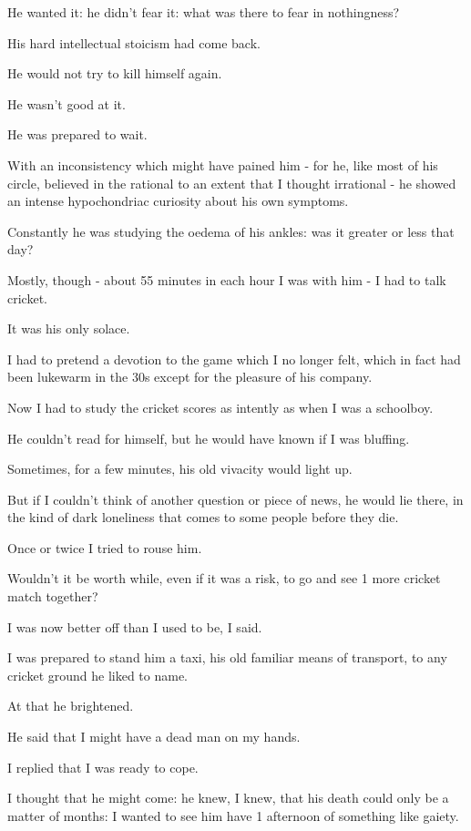 \documentclass{article}
\numberwithin{equation}{section}
\begin{document}
He wanted it: he didn't fear it: what was there to fear in nothingness?

His hard intellectual stoicism had come back.

He would not try to kill himself again.

He wasn't good at it.

He was prepared to wait.

With an inconsistency which might have pained him - for he, like most of his circle, believed in the rational to an extent that I thought irrational - he showed an intense hypochondriac curiosity about his own symptoms.

Constantly he was studying the oedema of his ankles: was it greater or less that day?

%
Mostly, though - about 55 minutes in each hour I was with him - I had to talk cricket.

It was his only solace.

I had to pretend a devotion to the game which I no longer felt, which in fact had been lukewarm in the 30s except for the pleasure of his company.

Now I had to study the cricket scores as intently as when I was a schoolboy.

He couldn't read for himself, but he would have known if I was bluffing.

Sometimes, for a few minutes, his old vivacity would light up.

But if I couldn't think of another question or piece of news, he would lie there, in the kind of dark loneliness that comes to some people before they die.

%
Once or twice I tried to rouse him.

Wouldn't it be worth while, even if it was a risk, to go and see 1 more cricket match together?

I was now better off than I used to be, I said.

I was prepared to stand him a taxi, his old familiar means of transport, to any cricket ground he liked to name.

At that he brightened.

He said that I might have a dead man on my hands.

I replied that I was ready to cope.

I thought that he might come: he knew, I knew, that his death could only be a matter of months: I wanted to see him have 1 afternoon of something like gaiety.
\end{document}
